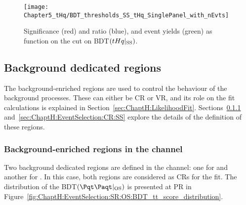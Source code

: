 \begin{figure}[h]
\centering
  \texttt{[image: Chapter5\_tHq/BDT\_thresholds\_SS\_tHq\_SinglePanel\_with\_nEvts]}
\caption{Significance (red) and \StoB ratio (blue), and \tHq event yields (green) as function on the cut on BDT$(tHq|_{\text{SS}})$.}
\label{fig:ChaptH:EventSelection:SR_SS:Significance}
\end{figure}





\subsection{Background dedicated regions}
\label{sec:ChaptH:EventSelection:CR}
The background-enriched regions are used to control the behaviour of the background processes.
These can either be CR or VR, and its role on the fit calculations is explained in Section~\ref{sec:ChaptH:LikelihoodFit}.
Sections~\ref{sec:ChaptH:EventSelection:CR:OS} and~\ref{sec:ChaptH:EventSelection:CR:SS}
explore the details of the definition of these regions.


\subsubsection{Background-enriched regions in the \dilepOStau channel}
\label{sec:ChaptH:EventSelection:CR:OS}
Two background dedicated regions are defined in the \dilepOStau channel: one for
\ttbar and another for \Zjets. In this case, both regions are considered as CRs for the fit.
The distribution of the BDT$(\ttbar|_{\text{OS}})$ is presented at PR in
Figure~\ref{fig:ChaptH:EventSelection:SR:OS:BDT_tt_score_distribution}.

